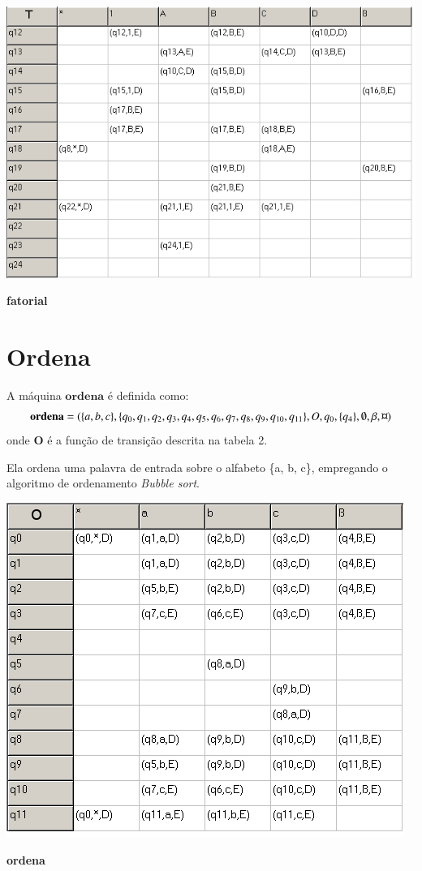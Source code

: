 \documentclass[a4paper]{article}
\begin{document}
\begin{table}[t!]
  \centering
  \includegraphics[scale=0.5]{fatorial_2.png}
  \caption{\textbf{fatorial}}
\end{table}

\section{Ordena}

A máquina $\mathbf{ordena}$ é definida como:
\begin{equation*}
\mathbf{ordena} = (\{a, b, c\}, \{q_0, q_1, q_2, q_3, q_4, q_5, q_6, q_7, q_8, q_9, q_{10}, q_{11}\}, O, q_0,
\{q_4\}, \emptyset, \beta, \text{\textcurrency} )\end{equation*} onde $\mathbf{O}$ é a função de transição descrita na tabela 2.

Ela ordena uma palavra de entrada sobre o alfabeto \{a, b, c\}, empregando o 
algoritmo de ordenamento \emph{Bubble sort}.

\begin{table}[b!]
  \centering
  \includegraphics[scale=0.5]{ordena.png}
  \caption{\textbf{ordena}}
\end{table}
\end{document}
